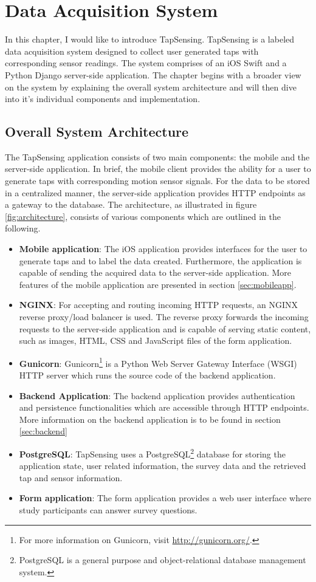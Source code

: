 \chapter{Data Acquisition System\label{cha:chapter3}}
In this chapter, I would like to introduce TapSensing. TapSensing is a labeled data acquisition system designed to collect user generated taps with corresponding sensor readings. The system comprises of an iOS Swift and a Python Django server-side application. The chapter begins with a broader view on the system by explaining the overall system architecture and will then dive into it's individual components and implementation.

\section{Overall System Architecture}

The TapSensing application consists of two main components: the mobile and the server-side application. In brief, the mobile client provides the ability for a user to generate taps with corresponding motion sensor signals. For the data to be stored in a centralized manner, the server-side application provides HTTP endpoints as a gateway to the database. The architecture, as illustrated in figure \ref{fig:architecture}, consists of various components which are outlined in the following.

\begin{itemize}
  \item \textbf{Mobile application}: The iOS application provides interfaces for the user to generate taps and to label the data created. Furthermore, the application is capable of sending the acquired data to the server-side application. More features of the mobile application are presented in section \ref{sec:mobileapp}. %
  \item \textbf{NGINX}: For accepting and routing incoming HTTP requests, an NGINX reverse proxy/load balancer is used. The reverse proxy forwards the incoming requests to the server-side application and is capable of serving static content, such as images, HTML, CSS and JavaScript files of the form application.
  \item \textbf{Gunicorn}: Gunicorn\footnote{For more information on Gunicorn, visit \url{http://gunicorn.org/}.} is a Python Web Server Gateway Interface (WSGI) HTTP server which runs the source code of the backend application.
  \item \textbf{Backend Application}: The backend application provides authentication and persistence functionalities which are accessible through HTTP endpoints. More information on the backend application is to be found in section \ref{sec:backend}
  \item \textbf{PostgreSQL}: TapSensing uses a PostgreSQL\footnote{PostgreSQL is a general purpose and object-relational database management system.} database for storing the application state, user related information, the survey data and the retrieved tap and sensor information.
  \item \textbf{Form application}: The form application provides a web user interface where study participants can answer survey questions.
\end{itemize}

